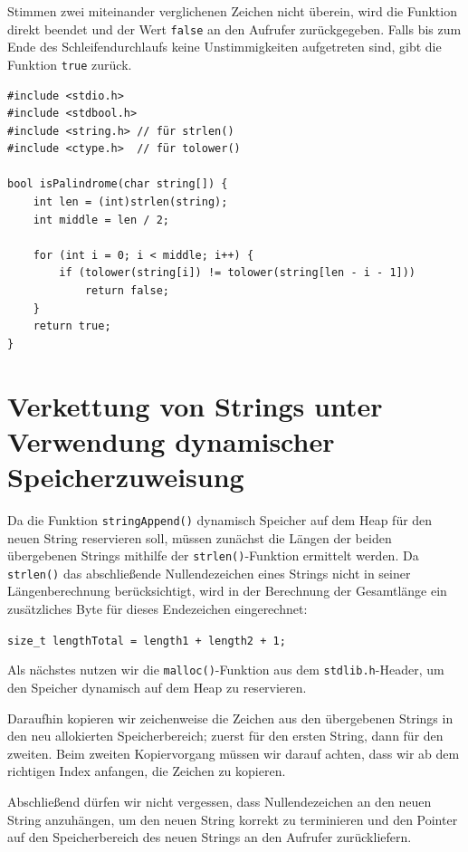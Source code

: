 Stimmen zwei miteinander verglichenen Zeichen nicht überein, wird die Funktion
direkt beendet und der Wert \texttt{false} an den Aufrufer zurückgegeben.
Falls bis zum Ende des Schleifendurchlaufs keine Unstimmigkeiten aufgetreten
sind, gibt die Funktion \texttt{true} zurück.

\begin{verbatim}
#include <stdio.h>
#include <stdbool.h>
#include <string.h> // für strlen()
#include <ctype.h>  // für tolower()

bool isPalindrome(char string[]) {
    int len = (int)strlen(string);
    int middle = len / 2;

    for (int i = 0; i < middle; i++) {
        if (tolower(string[i]) != tolower(string[len - i - 1]))
            return false;
    }
    return true;
}
\end{verbatim}



\chapter{Verkettung von Strings unter Verwendung dynamischer Speicherzuweisung}

Da die Funktion \texttt{stringAppend()} dynamisch Speicher auf dem Heap
für den neuen String reservieren soll, müssen zunächst die Längen der beiden
übergebenen Strings mithilfe der \texttt{strlen()}-Funktion ermittelt
werden. Da \texttt{strlen()} das abschließende Nullendezeichen eines
Strings nicht in seiner Längenberechnung berücksichtigt, wird in der Berechnung
der Gesamtlänge ein zusätzliches Byte für dieses Endezeichen eingerechnet:

\texttt{size_t lengthTotal = length1 + length2 + 1;}

Als nächstes nutzen wir die \texttt{malloc()}-Funktion aus dem
\texttt{stdlib.h}-Header, um den Speicher dynamisch auf dem Heap zu
reservieren.

Daraufhin kopieren wir zeichenweise die Zeichen aus den übergebenen Strings in
den neu allokierten Speicherbereich; zuerst für den ersten String, dann für den
zweiten. Beim zweiten Kopiervorgang müssen wir darauf achten, dass wir ab dem
richtigen Index anfangen, die Zeichen zu kopieren.

Abschließend dürfen wir nicht vergessen, dass Nullendezeichen an den neuen
String anzuhängen, um den neuen String korrekt zu terminieren und den Pointer
auf den Speicherbereich des neuen Strings an den Aufrufer zurückliefern.

